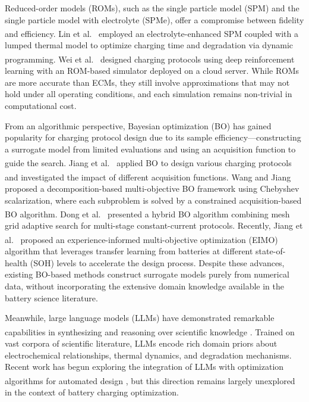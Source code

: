 \documentclass[lettersize,journal]{IEEEtran}
\let\OLDcite\cite
\renewcommand{\cite}[1]{\textsuperscript{\OLDcite{#1}}}
\begin{document}
Reduced-order models (ROMs), such as the single particle model (SPM) and the single particle model with electrolyte (SPMe), offer a compromise between fidelity and efficiency. Lin et al.\ \cite{ref12} employed an electrolyte-enhanced SPM coupled with a lumped thermal model to optimize charging time and degradation via dynamic programming. Wei et al.\ \cite{ref16} designed charging protocols using deep reinforcement learning with an ROM-based simulator deployed on a cloud server. While ROMs are more accurate than ECMs, they still involve approximations that may not hold under all operating conditions, and each simulation remains non-trivial in computational cost.

From an algorithmic perspective, Bayesian optimization (BO) has gained popularity for charging protocol design due to its sample efficiency---constructing a surrogate model from limited evaluations and using an acquisition function to guide the search. Jiang et al.\ \cite{ref4} applied BO to design various charging protocols and investigated the impact of different acquisition functions. Wang and Jiang \cite{ref17} proposed a decomposition-based multi-objective BO framework using Chebyshev scalarization, where each subproblem is solved by a constrained acquisition-based BO algorithm. Dong et al.\ \cite{ref18} presented a hybrid BO algorithm combining mesh grid adaptive search for multi-stage constant-current protocols. Recently, Jiang et al.\ \cite{ref_eimo} proposed an experience-informed multi-objective optimization (EIMO) algorithm that leverages transfer learning from batteries at different state-of-health (SOH) levels to accelerate the design process. Despite these advances, existing BO-based methods construct surrogate models purely from numerical data, without incorporating the extensive domain knowledge available in the battery science literature.

Meanwhile, large language models (LLMs) have demonstrated remarkable capabilities in synthesizing and reasoning over scientific knowledge \cite{ref_llm}. Trained on vast corpora of scientific literature, LLMs encode rich domain priors about electrochemical relationships, thermal dynamics, and degradation mechanisms. Recent work has begun exploring the integration of LLMs with optimization algorithms for automated design \cite{ref_llm_bo}, but this direction remains largely unexplored in the context of battery charging optimization.
\end{document}

